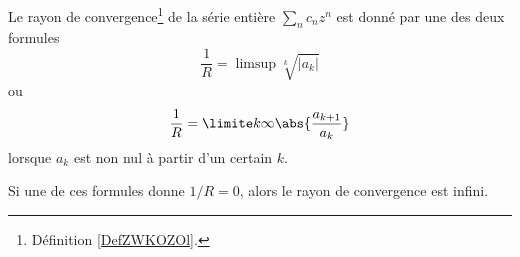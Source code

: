 \begin{theorem} \label{ThoSerPuissRap}
	Le rayon de convergence\footnote{Définition \ref{DefZWKOZOl}.} de la série entière \( \sum_n c_n z^n\) est donné par une des deux formules
	\begin{equation}		\label{EqRayCOnvSer}
		\frac{1}{ R } =\limsup\sqrt[k]{| a_k |}
	\end{equation}
	ou
	\begin{equation}		\label{EqAlphaSerPuissAtern}
		\frac{1}{ R }=\limite k \infty \abs{\frac{a_{k+1}}{a_k}}
	\end{equation}
	lorsque $a_k$ est non nul à partir d'un certain $k$.

	Si une de ces formules donne \( 1/R=0\), alors le rayon de convergence est infini.
\end{theorem}

